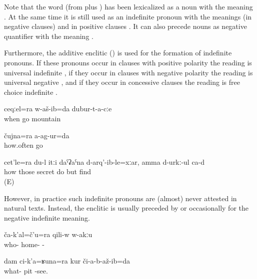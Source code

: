 Note that the word  (from   plus ) has been lexicalized as a noun with the meaning . At the same time it is still used as an indefinite pronoun with the meanings  (in negative clauses) and  in positive clauses . It can also precede nouns as negative quantifier with the meaning .

Furthermore, the additive enclitic  () is used for the formation of indefinite pronouns. If these pronouns occur in clauses with positive polarity the reading is universal indefinite , if they occur in clauses with negative polarity the reading is universal negative , and if they occur in concessive clauses the reading is free choice indefinite .
%
\begin{exe}
	\ex	\label{ex:I always went through the mountains}
	\gll	ceqːel=ra	w-aš-ib=da	dubur-t-a-cːe\\
		when	go	mountain\\
	\glt	{}

	\ex	\label{ex:I did not go even once.1}
	\gll	čujna=ra	a-ag-ur=da\\
		how.often	go\\
	\glt	{}

	\ex	\label{ex:However I hide them, (they always) find them}
	\gll	cet'le=ra	du-l	itːi	daˁʡaˁna	d-arq'-ib-le=xːar, amma d-urkː-ul ca-d\\
		how		those	secret	do	but	find \\
	\glt	{} (E)
\end{exe}

However, in practice such indefinite pronouns are (almost) never attested in natural texts. Instead, the enclitic  is usually preceded by   or occasionally   for the negative indefinite meaning.
%
\begin{exe}
	\ex	\label{ex:Nobody is at home}
	\gll	ča-k'al=č'u=ra	qili-w	w-akːu\\
		who-	home-\tsc{m}	-\\
	\glt	{}

	\ex	\label{ex:I do not see any pit}
	\gll	dam	ci-k'a=ʁuna=ra	kur	či-a-b-až-ib=da\\
			what-	pit	-see.\\
	\glt	{}
\end{exe}


